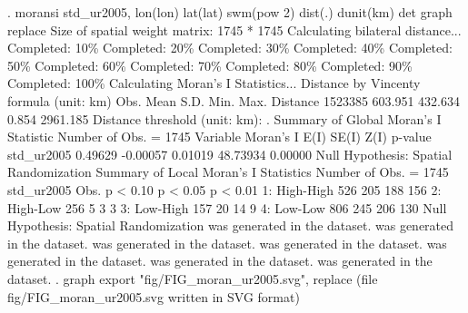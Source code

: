 . moransi std_ur2005, lon(lon) lat(lat) swm(pow 2) dist(.) dunit(km) det graph replace
{\smallskip}
Size of spatial weight matrix: 1745 * 1745
Calculating bilateral distance...
{\TOPT}
{\VBAR}Completed:  10\%{\VBAR}
{\VBAR}Completed:  20\%{\VBAR}
{\VBAR}Completed:  30\%{\VBAR}
{\VBAR}Completed:  40\%{\VBAR}
{\VBAR}Completed:  50\%{\VBAR}
{\VBAR}Completed:  60\%{\VBAR}
{\VBAR}Completed:  70\%{\VBAR}
{\VBAR}Completed:  80\%{\VBAR}
{\VBAR}Completed:  90\%{\VBAR}
{\VBAR}Completed: 100\%{\VBAR}
{\BOTT}
Calculating Moran's I Statistics...
{\smallskip}
Distance by Vincenty formula (unit: km)
                     {\VBAR}        Obs.        Mean         S.D.         Min.         Max.
            Distance {\VBAR}     1523385     603.951      432.634        0.854     2961.185
Distance threshold (unit: km):     .
{\smallskip}
{\smallskip}
Summary of Global Moran's I Statistic                      Number of Obs. =      1745
            Variable {\VBAR}  Moran's I         E(I)        SE(I)         Z(I)      p-value
          std_ur2005 {\VBAR}    0.49629     -0.00057      0.01019     48.73934      0.00000
Null Hypothesis: Spatial Randomization
{\smallskip}
{\smallskip}
Summary of Local Moran's I Statistics                      Number of Obs. =      1745
          std_ur2005 {\VBAR}           Obs.        p < 0.10        p < 0.05        p < 0.01
        1: High-High {\VBAR}            526             205             188             156
        2: High-Low  {\VBAR}            256               5               3               3
        3: Low-High  {\VBAR}            157              20              14               9
        4: Low-Low   {\VBAR}            806             245             206             130
Null Hypothesis: Spatial Randomization
{\smallskip}
{} was generated in the dataset.
{} was generated in the dataset.
{} was generated in the dataset.
{} was generated in the dataset.
{} was generated in the dataset.
{} was generated in the dataset.
{} was generated in the dataset.
{\smallskip}
. graph export "fig/FIG_moran_ur2005.svg", replace
(file fig/FIG_moran_ur2005.svg written in SVG format)
